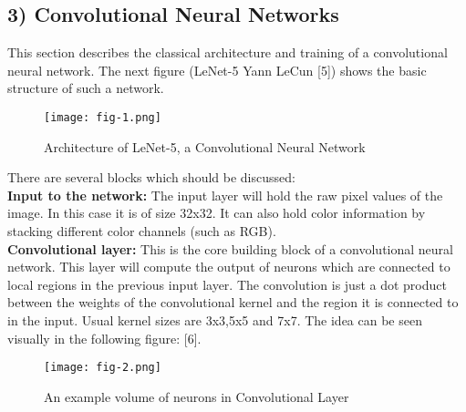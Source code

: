 \documentclass[a4paper]{article}
\begin{document}
\subsection*{3) Convolutional Neural Networks}
\begin{justify}

This section describes the classical architecture and training of a convolutional neural network. The next figure (LeNet-5 Yann LeCun [5]) shows the basic structure of such a network.

	\begin{tcolorbox}
		\begin{figure}[H]
			\begin{center}
				\texttt{[image: fig-1.png]}
				\caption{Architecture of LeNet-5, a Convolutional Neural Network}
			\end{center}
		\end{figure}
	\end{tcolorbox}

There are several blocks which should be discussed:
\newline
\\
\textbf{Input to the network:} The input layer will hold the raw pixel values of the image. In this case it is of size 32x32. It can also hold color information by stacking different color channels (such as RGB).
\newline
\\
\textbf{Convolutional layer:} This is the core building block of a convolutional neural network. This layer will compute the output of neurons which are connected to local regions in the previous input layer.
The convolution is just a dot product between the weights of the convolutional kernel and the region it is connected to in the input. Usual kernel sizes are 3x3,5x5 and 7x7. The idea can be seen visually in the following figure: [6].
   	\begin{tcolorbox}
   		\begin{figure}[H]
   			\begin{center}
   				\texttt{[image: fig-2.png]}
   				\caption{An example volume of neurons in Convolutional Layer}
   			\end{center}
   		\end{figure}
   	\end{tcolorbox}


\end{justify}
\end{document}

